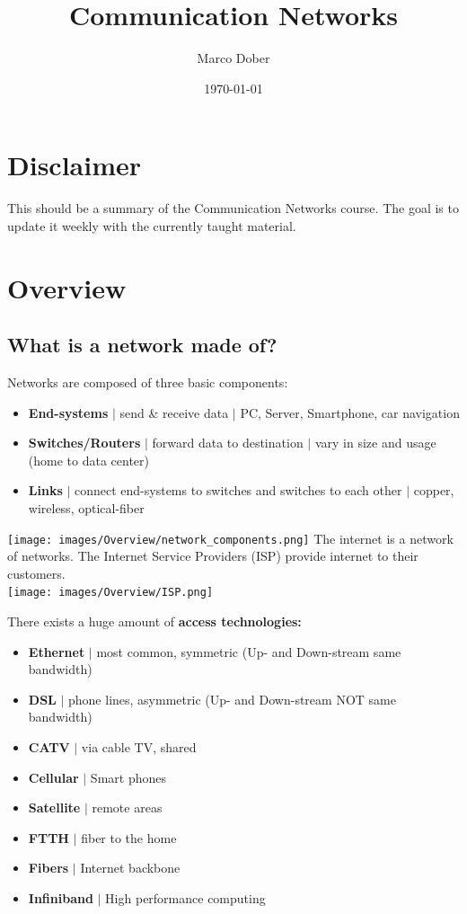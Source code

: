 \documentclass[a4paper, fontsize=8pt, landscape, DIV=1]{scrartcl}
\title{Communication Networks}
\author{Marco Dober}
\date{\today}
\begin{document}
	\setcounter{secnumdepth}{3} %
	\begin{multicols*}{4}
		\section*{Disclaimer}
		This should be a summary of the Communication Networks course. The goal is to
		update it weekly with the currently taught material.  	
		\newpage
		
		\maketitle 
		\thispagestyle{fancy}
		
		\section{Overview}
		\subsection{What is a network made of?}
		Networks are composed of three basic components:
		\begin{itemize}
			\item \textbf{End-systems} $\vert$ send \& receive data $\vert$  PC,
			Server, Smartphone, car navigation
			\item \textbf{Switches/Routers} $\vert$ forward data to destination $\vert$
			vary in size and usage (home to data center)
			\item \textbf{Links} $\vert$ connect end-systems to switches and switches
			to each other $\vert$ copper, wireless, optical-fiber
		\end{itemize}
		\texttt{[image: images/Overview/network\_components.png]}
		The internet is a network of networks. The Internet Service Providers (ISP)
		provide internet to their customers.\\
		\texttt{[image: images/Overview/ISP.png]}
		\columnbreak
		
		There exists a huge amount of \textbf{access technologies: }
		\begin{itemize}[noitemsep]
			\item \textbf{Ethernet} $\vert$ most common, symmetric (Up- and Down-stream
			same bandwidth)
			\item \textbf{DSL} $\vert$ phone lines, asymmetric (Up- and Down-stream NOT
			same bandwidth)
			\item \textbf{CATV} $\vert$ via cable TV, shared
			\item \textbf{Cellular} $\vert$ Smart phones 
			\item \textbf{Satellite} $\vert$ remote areas
			\item \textbf{FTTH} $\vert$ fiber to the home
			\item \textbf{Fibers} $\vert$ Internet backbone 
			\item \textbf{Infiniband} $\vert$ High performance computing 
		\end{itemize}

\end{multicols*}
\end{document}
